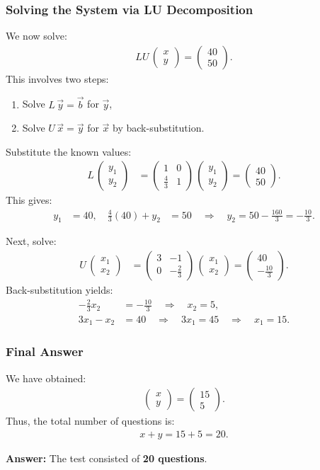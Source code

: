 \documentclass{beamer}
\newcommand{\myvec}[1]{\ensuremath{\begin{pmatrix}#1\end{pmatrix}}}
\numberwithin{equation}{section}
\begin{document}
\begin{frame}
\frametitle{Solving the System via LU Decomposition}
We now solve:
\begin{align}
LU\,\myvec{x \\ y} = \myvec{40 \\ 50}.
\end{align}
This involves two steps:
\begin{enumerate}
    \item Solve $L\,\vec{y} = \vec{b}$ for $\vec{y}$,
    \item Solve $U\,\vec{x} = \vec{y}$ for $\vec{x}$ by back-substitution.
\end{enumerate}
Substitute the known values:
\begin{align}
L\,\myvec{y_1 \\ y_2} &= \myvec{1 & 0\\ \frac{4}{3} & 1}\,\myvec{y_1 \\ y_2} = \myvec{40 \\ 50}.
\end{align}
This gives:
\begin{align}
  y_1 &= 40, \quad \frac{4}{3}(40) + y_2 &= 50 \quad \Rightarrow \quad y_2 = 50 - \frac{160}{3} = -\frac{10}{3}.
\end{align}
\end{frame}
\begin{frame}
Next, solve:
\begin{align}
U\,\myvec{x_1 \\ x_2} &= \myvec{3 & -1\\ 0 & -\frac{2}{3}}\,\myvec{x_1 \\ x_2} = \myvec{40 \\ -\frac{10}{3}}.
\end{align}
Back-substitution yields:
\begin{align}
-\frac{2}{3}x_2 &= -\frac{10}{3} \quad \Rightarrow \quad x_2 = 5,\\
3x_1 - x_2 &= 40 \quad \Rightarrow \quad 3x_1 = 45 \quad \Rightarrow \quad x_1 = 15.
\end{align}
\end{frame}

\begin{frame}
\frametitle{Final Answer}
We have obtained:
\begin{align}
\myvec{x \\ y} = \myvec{15 \\ 5}.
\end{align}
Thus, the total number of questions is:
\begin{align}
x+y = 15+5 = 20.
\end{align}

\bigskip
\textbf{Answer:} The test consisted of \textbf{20 questions}.
\end{frame}
\end{document}
